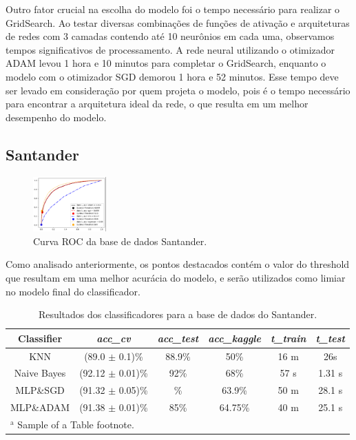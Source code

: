 \documentclass[conference]{IEEEtran}
\begin{document}
Outro fator crucial na escolha do modelo foi o tempo necessário para realizar o GridSearch. Ao testar diversas combinações de funções de ativação e arquiteturas de redes com 3 camadas contendo até 10 neurônios em cada uma, observamos tempos significativos de processamento. A rede neural utilizando o otimizador ADAM levou 1 hora e 10 minutos para completar o GridSearch, enquanto o modelo com o otimizador SGD demorou 1 hora e 52 minutos. Esse tempo deve ser levado em consideração por quem projeta o modelo, pois é o tempo necessário para encontrar a arquitetura ideal da rede, o que resulta em um melhor desempenho do modelo.

\subsection{Santander}

\vspace{25pt}

\begin{figure}[htbp]
\centerline{\includegraphics[width=0.25\textwidth]{AUC_santander.png}}
\caption{Curva ROC da base de dados Santander.}
\label{fig}
\end{figure}

\vspace{25pt}

Como analisado anteriormente, os pontos destacados contém o valor do threshold que resultam em uma melhor acurácia do modelo, e serão utilizados como limiar no modelo final do classificador.

\vspace{10pt}

\begin{table}[htbp]
\caption{Resultados dos classificadores para a base de dados do Santander.}
\begin{center}
\begin{tabular}{|c|c|c|c|c|c|}
\hline
\textbf{Classifier} & \textbf{\textit{acc\_cv}} & \textbf{\textit{acc\_test}} & \textbf{\textit{acc\_kaggle}} & \textbf{\textit{t\_train}} & \textbf{\textit{t\_test}} \\
\hline
KNN & (89.0 \(\pm\) 0.1)\% & 88.9\% & 50\% & 16 m & 26s \\
\hline
Naive Bayes & (92.12 \(\pm\) 0.01)\% & 92\% & 68\% & 57 s & 1.31 s \\
\hline
MLP\&SGD & (91.32 \(\pm\) 0.05)\% & \% & 63.9\% &  50 m & 28.1 s \\
\hline
MLP\&ADAM & (91.38 \(\pm\) 0.01)\% & 85\% & 64.75\% & 40 m & 25.1 s \\
\hline
\multicolumn{6}{l}{$^{\mathrm{a}}$ Sample of a Table footnote.}
\end{tabular}
\label{tab1}
\end{center}
\end{table}
\end{document}
